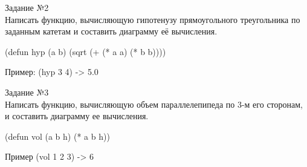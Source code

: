 \newpage
\vspace*{10mm}
{\LARGE Задание №2}\\

Написать функцию, вычисляющую гипотенузу прямоугольного треугольника по заданным катетам и составить диаграмму её вычисления.

(defun hyp (a b) (sqrt (+ (* a a) (* b b))))

Пример: (hyp 3 4) -> 5.0
\begin{figure}[ht!]
\end{figure}

\newpage
\vspace*{10mm}
{\LARGE Задание №3}\\

Написать функцию, вычисляющую объем параллелепипеда по 3-м его сторонам, и составить диаграмму ее вычисления.

(defun vol (a b h) (* a b h))

Пример (vol 1 2 3) -> 6

